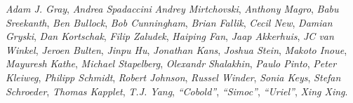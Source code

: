\emph{Adam J. Gray},
\emph{Andrea Spadaccini}
\emph{Andrey Mirtchovski},
\emph{Anthony Magro},
\emph{Babu Sreekanth},
\emph{Ben Bullock},
\emph{Bob Cunningham},
\emph{Brian Fallik},
\emph{Cecil New},
\emph{Damian Gryski},
\emph{Dan Kortschak},
\emph{Filip Zaludek},
\emph{Haiping Fan},
\emph{Jaap Akkerhuis},
\emph{JC van Winkel},
\emph{Jeroen Bulten},
\emph{Jinpu Hu},
\emph{Jonathan Kans},
\emph{Joshua Stein},
\emph{Makoto Inoue},
\emph{Mayuresh Kathe},
\emph{Michael Stapelberg},
\emph{Olexandr Shalakhin},
\emph{Paulo Pinto},
\emph{Peter Kleiweg},
\emph{Philipp Schmidt},
\emph{Robert Johnson},
\emph{Russel Winder},
\emph{Sonia Keys},
\emph{Stefan Schroeder},
\emph{Thomas Kapplet},
\emph{T.J. Yang},
\emph{``Cobold''},
\emph{``Simoc''},
\emph{``Uriel''},
\emph{Xing Xing}.
